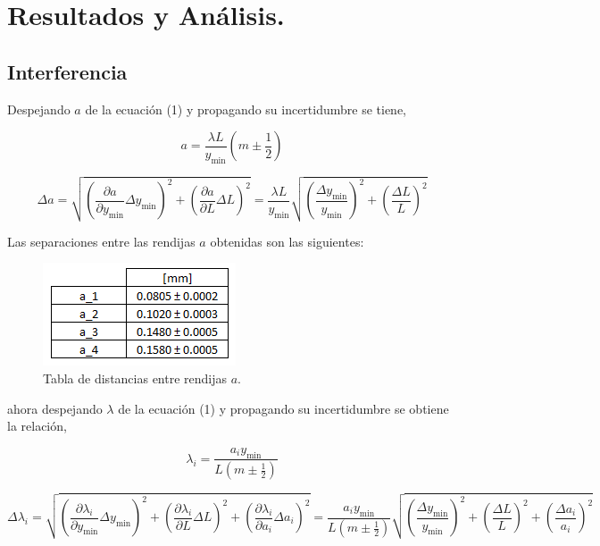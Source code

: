 \documentclass[DIV=calc, paper=a4, fontsize=10.5pt]{scrartcl}
\begin{document}
\section*{\textcolor{carmine}{Resultados y Análisis.}}

\subsection*{\textcolor{carmine}{Interferencia}}

Despejando $a$ de la ecuación (1) y propagando su incertidumbre se tiene,

\begin{equation*}
    a = \frac{\lambda L}{y_{\text{min}}} \left(m \pm \frac{1}{2}\right)
\end{equation*}



\begin{equation*}
    \Delta a = \sqrt{ \left(\frac{\partial a}{\partial y_{\text{min}}}\Delta y_{\text{min}}\right)^{2} + \left(\frac{\partial a}{\partial L} \Delta L\right)^{2}}= \frac{\lambda L}{y_{\text{min}}}\sqrt{\left(\frac{\Delta y_{\text{min}}}{y_{\text{min}}}\right)^{2} + \left(\frac{\Delta L}{L}\right)^{2}}
\end{equation*}

Las separaciones entre las rendijas $a$ obtenidas son las siguientes:

\begin{figure}[H]
    \centering
    \includegraphics{tablas/tabla 1.PNG}
    \caption{Tabla de distancias entre rendijas $a$.}
    \label{fig:my_label}
\end{figure}

ahora despejando $\lambda$ de la ecuación (1) y propagando su incertidumbre se obtiene la relación,

\begin{equation*}
    \lambda_i = \frac{a_i y_{\text{min}}}{L (m \pm \frac{1}{2})}
\end{equation*}


\begin{equation*}
    \Delta \lambda_i = \sqrt{ \left(\frac{\partial \lambda_i}{\partial y_{\text{min}}}\Delta y_{\text{min}}\right)^{2} + \left(\frac{\partial \lambda_i}{\partial L} \Delta L\right)^{2} + \left(\frac{\partial \lambda_i}{\partial  a_i} \Delta a_i\right)^{2}}= \frac{a_i y_{\text{min}}}{L (m \pm \frac{1}{2})} \sqrt{\left(\frac{\Delta y_{\text{min}}}{y_{\text{min}}}\right)^{2}+ \left(\frac{\Delta L}{L}\right)^{2} +\left(\frac{\Delta a_i}{a_i}\right)^{2}}
\end{equation*}
\end{document}
